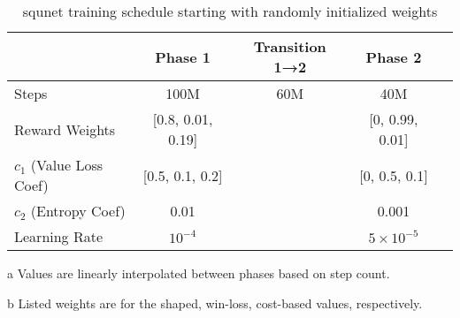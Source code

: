 \documentclass[conference,onecolumn]{IEEEtran}
\newcounter{supptable}
\newenvironment{supptable}
  {\renewcommand{\tablename}{Supplemental Table}\setcounter{table}{\value{supptable}}\addtocounter{supptable}{1}\begin{table}}
  {\end{table}\setcounter{supptable}{\value{table}}}
\begin{document}
\begin{supptable}[H]
    \centering
    \begin{threeparttable}
    \caption{squnet training schedule starting with randomly initialized weights}
    \label{tab:squnet-training-schedule}
    \begin{tabular}{lcccc}
    \toprule
     & Phase 1 & Transition 1→2\tnote{a} & Phase 2 \\
     \midrule
    Steps & 100M & 60M & 40M \\
    Reward Weights\tnote{b} & [0.8, 0.01, 0.19] &  & [0, 0.99, 0.01] \\
    $c_1$ (Value Loss Coef)\tnote{b} & [0.5, 0.1, 0.2] &  & [0, 0.5, 0.1]\\
    $c_2$ (Entropy Coef) & 0.01 & & 0.001 \\
    Learning Rate & $10^{-4}$ & & $5 \times 10^{-5}$ \\
    \bottomrule
    \end{tabular}
    \begin{tablenotes}
       \item[a] Values are linearly interpolated between phases based on step count.
       \item[b] Listed weights are for the shaped, win-loss, cost-based values, respectively.
    \end{tablenotes}
    \end{threeparttable}
\end{supptable}
\end{document}
